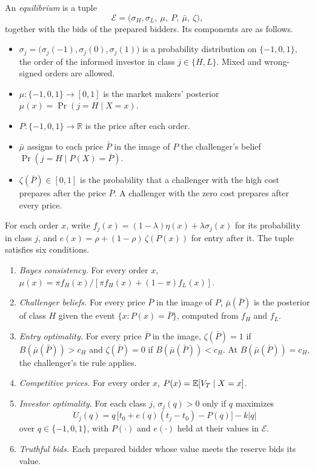 \begin{definition}[Equilibrium]\label{def:equilibrium}
An \emph{equilibrium} is a tuple
\[
\mathcal{E}=\bigl(\sigma_H,\sigma_L,\ \mu,\ P,\ \bar\mu,\ \zeta\bigr),
\]
together with the bids of the prepared bidders. Its components are as follows.
\begin{itemize}[leftmargin=2em]
\item \(\sigma_j=\bigl(\sigma_j(-1),\sigma_j(0),\sigma_j(1)\bigr)\) is a probability distribution on
\(\{-1,0,1\}\), the order of the informed investor in class \(j\in\{H,L\}\). Mixed and wrong-signed orders are
allowed.
\item \(\mu:\{-1,0,1\}\to[0,1]\) is the market makers' posterior \(\mu(x)=\Pr(j=H\mid X=x)\).
\item \(P:\{-1,0,1\}\to\mathbb{R}\) is the price after each order.
\item \(\bar\mu\) assigns to each price \(\bar P\) in the image of \(P\) the challenger's belief
\(\Pr(j=H\mid P(X)=\bar P)\).
\item \(\zeta(\bar P)\in[0,1]\) is the probability that a challenger with the high cost prepares after the price
\(\bar P\). A challenger with the zero cost prepares after every price.
\end{itemize}
For each order \(x\), write \(f_j(x)=(1-\lambda)\eta(x)+\lambda\sigma_j(x)\) for its probability in class
\(j\), and \(e(x)=\rho+(1-\rho)\,\zeta(P(x))\) for entry after it. The tuple satisfies six conditions.
\begin{enumerate}[label=(E\arabic*),leftmargin=3em]
\item \emph{Bayes consistency.} For every order \(x\),
\(\mu(x)=\pi f_H(x)/[\pi f_H(x)+(1-\pi)f_L(x)]\).
\item \emph{Challenger beliefs.} For every price \(\bar P\) in the image of \(P\), \(\bar\mu(\bar P)\) is the
posterior of class \(H\) given the event \(\{x:P(x)=\bar P\}\), computed from \(f_H\) and \(f_L\).
\item \emph{Entry optimality.} For every price \(\bar P\) in the image, \(\zeta(\bar P)=1\) if
\(B(\bar\mu(\bar P))>c_H\) and \(\zeta(\bar P)=0\) if \(B(\bar\mu(\bar P))<c_H\). At
\(B(\bar\mu(\bar P))=c_H\), the challenger's tie rule applies.
\item \emph{Competitive prices.} For every order \(x\), \(P(x)=\mathbb{E}[V_T\mid X=x]\).
\item \emph{Investor optimality.} For each class \(j\), \(\sigma_j(q)>0\) only if \(q\) maximizes
\[
U_j(q)=q\,\bigl[t_0+e(q)(t_j-t_0)-P(q)\bigr]-k|q|
\]
over \(q\in\{-1,0,1\}\), with \(P(\cdot)\) and \(e(\cdot)\) held at their values in \(\mathcal{E}\).
\item \emph{Truthful bids.} Each prepared bidder whose value meets the reserve bids its value.
\end{enumerate}
\end{definition}

